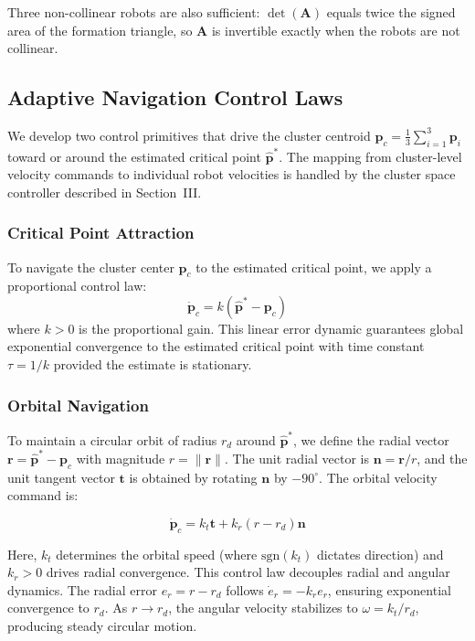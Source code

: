 \documentclass[lettersize,journal]{IEEEtran}
\begin{document}
Three non-collinear robots are also sufficient: $\det(\mathbf{A})$ equals twice the signed area of the formation triangle, so $\mathbf{A}$ is invertible exactly when the robots are not collinear.


\subsection{Adaptive Navigation Control Laws}
\label{sec:control_primitives}

We develop two control primitives that drive the cluster centroid $\mathbf{p}_c = \frac{1}{3}\sum_{i=1}^{3}\mathbf{p}_i$ toward or around the estimated critical point $\hat{\mathbf{p}}^*$. The mapping from cluster-level velocity commands to individual robot velocities is handled by the cluster space controller described in Section~III.

\subsubsection{Critical Point Attraction}
To navigate the cluster center $\mathbf{p}_c$ to the estimated critical point, we apply a proportional control law:
\begin{equation}\label{eq:10}
\dot{\mathbf{p}}_c = k(\hat{\mathbf{p}}^* - \mathbf{p}_c)
\end{equation}
where $k > 0$ is the proportional gain. This linear error dynamic guarantees global exponential convergence to the estimated critical point with time constant $\tau = 1/k$ provided the estimate is stationary.

\subsubsection{Orbital Navigation}
To maintain a circular orbit of radius $r_d$ around $\hat{\mathbf{p}}^*$, we define the radial vector $\mathbf{r} = \hat{\mathbf{p}}^* - \mathbf{p}_c$ with magnitude $r = \|\mathbf{r}\|$. The unit radial vector is $\mathbf{n} = \mathbf{r}/r$, and the unit tangent vector $\mathbf{t}$ is obtained by rotating $\mathbf{n}$ by $-90^\circ$. The orbital velocity command is:

\begin{equation}\label{eq:11}
\dot{\mathbf{p}}_c = k_t \mathbf{t} + k_r(r - r_d)\mathbf{n}
\end{equation}

Here, $k_t$ determines the orbital speed (where $\text{sgn}(k_t)$ dictates direction) and $k_r > 0$ drives radial convergence.
This control law decouples radial and angular dynamics. The radial error $e_r = r - r_d$ follows $\dot{e}_r = -k_r e_r$, ensuring exponential convergence to $r_d$. As $r \to r_d$, the angular velocity stabilizes to $\omega = k_t/r_d$, producing steady circular motion.
\end{document}
